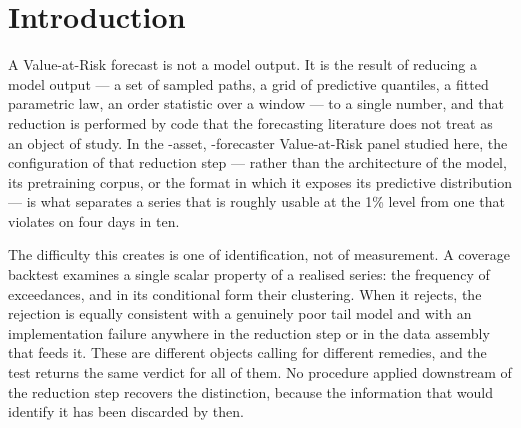 \documentclass[preprint,11pt,authoryear]{elsarticle}
\newcommand{\1}{\boldsymbol{1}}
\begin{document}
\begin{frontmatter}
\begin{abstract}
On a panel of equity, bond, commodity, cryptocurrency and foreign-exchange
series, the shift brings every forecaster it touches --- GARCH-family benchmarks
and zero-shot time series foundation models alike --- to nominal violation
rates. That uniformity has a consequence: a corrected coverage column describes
the correction rather than the forecaster behind it, so the instrument that
triggers recalibration is also the one that would evaluate it. Recalibration is
accordingly an intervention with an indication, and the paper gives a rule for
when it applies, keyed to information available at the decision date.

	\bigskip\noindent
	\textbf{Keywords:} Value-at-Risk; Conformal prediction; Temporal dependence; Time series
	foundation models; Regulatory backtesting

	\bigskip\noindent
	\textbf{JEL:} C14\,|\,C53\,|\,C58\,|\,G17\,|\,G32
\end{abstract}
\end{frontmatter}
\section{Introduction}
\label{sec:intro}

A Value-at-Risk forecast is not a model output. It is the result of reducing a
model output --- a set of sampled paths, a grid of predictive quantiles, a fitted
parametric law, an order statistic over a window --- to a single number, and that
reduction is performed by code that the forecasting literature does not treat as
an object of study. In the \nMainAssets-asset,
\nMainForecasters-forecaster Value-at-Risk panel studied here, the configuration of that
reduction step --- rather than the architecture of the model, its pretraining
corpus, or the format in which it exposes its predictive distribution --- is what
separates a series that is roughly usable at the 1\% level from one that violates
on four days in ten.

The difficulty this creates is one of identification, not of measurement. A
coverage backtest examines a single scalar property of a realised series: the
frequency of exceedances, and in its conditional form their clustering. When it
rejects, the rejection is equally consistent with a genuinely poor tail model and
with an implementation failure anywhere in the reduction step or in the data
assembly that feeds it. These are different objects calling for different
remedies, and the test returns the same verdict for all of them. No procedure
applied downstream of the reduction step recovers the distinction, because the
information that would identify it has been discarded by then.
\end{document}
